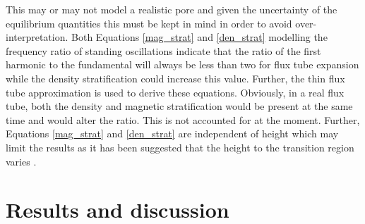     This may or may not model a realistic pore and given the uncertainty of the equilibrium quantities this must be kept in mind in order to avoid over-interpretation.
    Both Equations \ref{mag_strat} and \ref{den_strat} modelling the frequency ratio of standing oscillations indicate that the ratio of the first harmonic to the fundamental will always be less than two for flux tube expansion while the density stratification could increase this value.
    Further, the thin flux tube approximation is used to derive these equations.
    Obviously, in a real flux tube, both the density and magnetic stratification would be present at the same time and would alter the ratio.
    This is not accounted for at the moment.
    Further, Equations \ref{mag_strat} and \ref{den_strat} are independent of height which may limit the results as it has been suggested that the height to the transition region varies \citep{tian2009solar}.	
    
\section{Results and discussion}
\label{res}

